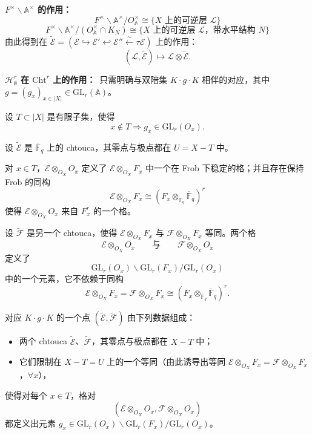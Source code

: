\par\medskip\noindent\textbf{$F^\times\backslash \mathbb{A}^\times$ 的作用：}\
\[ F^\times\backslash \mathbb{A}^\times / O^\times_{\mathbb{A}} \cong \{\text{$X$ 上的可逆层 } \mathcal{L}\} \]
\[ F^\times\backslash \mathbb{A}^\times / (O^\times_{\mathbb{A}} \cap K_N) \cong \{\text{$X$ 上的可逆层 } \mathcal{L} \text{，带水平结构 } N\} \]
由此得到在 $\tilde{\mathcal{E}} = (\mathcal{E} \hookrightarrow \mathcal{E}' \hookleftarrow \mathcal{E}'' \xleftarrow{\sim} \tau\mathcal{E})$ 上的作用：
\[ (\mathcal{L}, \tilde{\mathcal{E}}) \mapsto \mathcal{L} \otimes \tilde{\mathcal{E}}. \]

\par\medskip\noindent\textbf{$\mathcal{H}^r_\emptyset$ 在 $\mathrm{Cht}^r$ 上的作用：}\
只需明确与双陪集 $K \cdot g \cdot K$ 相伴的对应，其中 $g = (g_x)_{x \in |X|} \in \mathrm{GL}_r(\mathbb{A})$。

设 $T \subset |X|$ 是有限子集，使得
\[ x \notin T \Rightarrow g_x \in \mathrm{GL}_r(O_x). \]

设 $\tilde{\mathcal{E}}$ 是 $\overline{\mathbb{F}}_q$ 上的 chtouca，其零点与极点都在 $U = X - T$ 中。

对 $x \in T$，$\mathcal{E} \otimes_{O_X} O_x$ 定义了 $\mathcal{E} \otimes_{O_X} F_x$ 中一个在 Frob 下稳定的格；并且存在保持 Frob 的同构
\[ \mathcal{E} \otimes_{O_X} F_x \cong (F_x \otimes_{\mathbb{F}_q} \overline{\mathbb{F}}_q)^r \]
使得 $\mathcal{E} \otimes_{O_X} O_x$ 来自 $F^r_x$ 的一个格。

设 $\tilde{\mathcal{F}}$ 是另一个 chtouca，使得 $\mathcal{E} \otimes_{O_X} F_x$ 与 $\mathcal{F} \otimes_{O_X} F_x$ 等同。两个格
\[ \mathcal{E} \otimes_{O_X} O_x \qquad \text{与} \qquad \mathcal{F} \otimes_{O_X} O_x \]
定义了
\[ \mathrm{GL}_r(O_x)\backslash \mathrm{GL}_r(F_x)/\mathrm{GL}_r(O_x) \]
中的一个元素，它不依赖于同构
\[ \mathcal{E} \otimes_{O_X} F_x = \mathcal{F} \otimes_{O_X} F_x \cong (F_x \otimes_{\mathbb{F}_q} \overline{\mathbb{F}}_q)^r. \]

对应 $K \cdot g \cdot K$ 的一个点 $(\tilde{\mathcal{E}}, \tilde{\mathcal{F}})$ 由下列数据组成：

\origpage{8}
\begin{itemize}
\item 两个 chtouca $\tilde{\mathcal{E}}$、$\tilde{\mathcal{F}}$，其零点与极点都在 $X - T$ 中；
\item 它们限制在 $X - T = U$ 上的一个等同（由此诱导出等同 $\mathcal{E} \otimes_{O_X} F_x = \mathcal{F} \otimes_{O_X} F_x$，$\forall x$），
\end{itemize}
使得对每个 $x \in T$，格对
\[ (\mathcal{E} \otimes_{O_X} O_x, \mathcal{F} \otimes_{O_X} O_x) \]
都定义出元素 $g_x \in \mathrm{GL}_r(O_x)\backslash \mathrm{GL}_r(F_x)/\mathrm{GL}_r(O_x)$。

